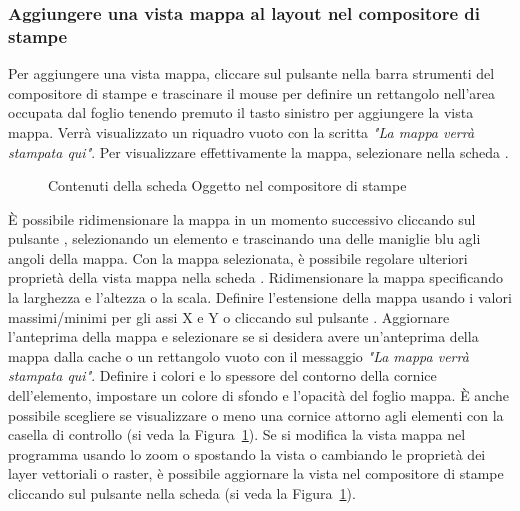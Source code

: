 \subsubsection{Aggiungere una vista mappa al layout nel compositore di
stampe}

Per aggiungere una vista mappa, cliccare sul pulsante
 nella barra strumenti
del compositore di stampe e trascinare il mouse per definire un rettangolo
nell'area occupata dal foglio tenendo premuto il tasto sinistro per aggiungere
la vista mappa. Verrà visualizzato un riquadro vuoto con la scritta
\textit{"La mappa verrà stampata qui"}. Per visualizzare effettivamente la mappa,
selezionare  nella scheda .

\begin{figure}[ht]
\centering
\caption{Contenuti della scheda Oggetto nel compositore di stampe \nixcaption}\label{fig:print_composer_map_item}
   \goodgap
\end{figure}

È possibile ridimensionare la mappa in un momento successivo cliccando sul
pulsante , selezionando
un elemento e trascinando una delle maniglie blu agli angoli della mappa. Con
la mappa selezionata, è possibile regolare ulteriori proprietà della vista
mappa nella scheda . Ridimensionare la mappa specificando la
larghezza e l'altezza o la scala. Definire l'estensione della mappa usando i
valori massimi/minimi per gli assi X e Y o cliccando sul pulsante
. Aggiornare l'anteprima della
mappa e selezionare se si desidera avere un'anteprima della mappa dalla cache
o un rettangolo vuoto con il messaggio \textit{"La mappa verrà stampata qui"}.
Definire i colori e lo spessore del contorno della cornice dell'elemento,
impostare un colore di sfondo e l'opacità del foglio mappa. È anche possibile
scegliere se visualizzare o meno una cornice attorno agli elementi con la
casella di controllo  (si veda la
Figura~\ref{fig:print_composer_map_item}). Se si modifica la vista mappa nel
programma usando lo zoom o spostando la vista o cambiando le proprietà dei layer
vettoriali o raster, è possibile aggiornare la vista nel compositore di
stampe cliccando sul pulsante  nella scheda
 (si veda la Figura~\ref{fig:print_composer_map_item}). 

